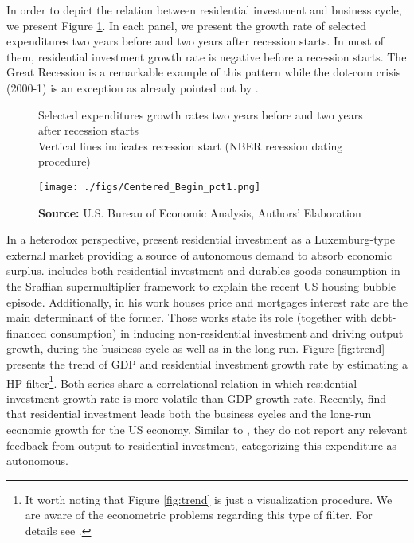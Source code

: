 \documentclass[12pt, a4paper]{article}
\begin{document}
In order to depict the relation between residential investment and business cycle, we present Figure \ref{fig:cycle}.
In each panel, we present the growth rate of selected expenditures two years before and two years after recession starts.
In most of them, residential investment growth rate is negative before a recession starts.
The Great Recession is a remarkable example of this pattern while the dot-com crisis (2000-1) is an exception as already pointed out by \textcite{leamer_housing_2007}.


\begin{figure}[H]
	\centering
	\caption{Selected expenditures growth rates two years before and two years after recession starts\\Vertical lines indicates recession start (NBER recession dating procedure)}
	\label{fig:cycle}
	\texttt{[image: ./figs/Centered\_Begin\_pct1.png]}
	\caption*{\textbf{Source:} U.S. Bureau of Economic Analysis, Authors' Elaboration}
\end{figure}


In a heterodox perspective, \textcites{fiebiger_semi-autonomous_2018}{fiebiger_trend_2017} present residential investment as a Luxemburg-type external market providing a source of autonomous demand to absorb economic surplus.
\textcite{teixeira_crescimento_2015} includes both residential investment  and durables goods consumption in the Sraffian supermultiplier framework to explain the recent US housing bubble episode.
Additionally, in his work houses price and mortgages interest rate are the main determinant of the former.
Those works state its role (together with debt-financed consumption) in inducing non-residential investment and driving output growth, during the business cycle as well as in the long-run.
Figure \ref{fig:trend} presents the trend of GDP and residential investment growth rate by estimating a HP filter\footnote{It worth noting that Figure \ref{fig:trend} is just a visualization procedure. We are aware of the econometric problems regarding this type of filter. For details see \textcite{NBER_HP}.}.
Both series share a correlational relation in which residential investment growth rate is more volatile than GDP growth rate.
Recently, \textcite{perez_Montiel_2021} find that residential investment leads both the business cycles and the long-run economic growth for the US economy.
Similar to \textcite{girardi_long-run_2016}, they do not report any relevant feedback from output to residential investment, categorizing this expenditure as autonomous.
\end{document}
